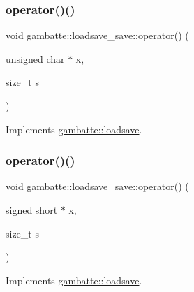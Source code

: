 \subsubsection{\texorpdfstring{operator()()}{operator()()}\hspace{0.1cm}{\footnotesize\ttfamily [11/19]}}
{\footnotesize\ttfamily void gambatte\+::loadsave\+\_\+save\+::operator() (\begin{DoxyParamCaption}\item[{unsigned char $\ast$}]{x,  }\item[{size\+\_\+t}]{s }\end{DoxyParamCaption})\hspace{0.3cm}{\ttfamily [virtual]}}



Implements \hyperlink{classgambatte_1_1loadsave_ae1ab673c435463f83c510446d7455436}{gambatte\+::loadsave}.

\mbox{\label{classgambatte_1_1loadsave__save_a5c16d14663134c6a20d967889edab1b3}} 
\subsubsection{\texorpdfstring{operator()()}{operator()()}\hspace{0.1cm}{\footnotesize\ttfamily [12/19]}}
{\footnotesize\ttfamily void gambatte\+::loadsave\+\_\+save\+::operator() (\begin{DoxyParamCaption}\item[{signed short $\ast$}]{x,  }\item[{size\+\_\+t}]{s }\end{DoxyParamCaption})\hspace{0.3cm}{\ttfamily [virtual]}}



Implements \hyperlink{classgambatte_1_1loadsave_ac30751838bea28e3e266da5194b429d1}{gambatte\+::loadsave}.

\mbox{\label{classgambatte_1_1loadsave__save_a463457f83303ddf1584a318a6e068229}} 
